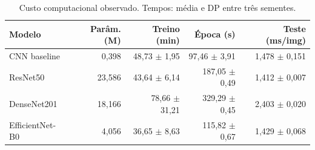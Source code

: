 \begin{table}[htbp]
\centering
\caption{Custo computacional observado. Tempos: média e DP entre três sementes.}
\label{tab:cost}
\small
\begin{tabular}{lrrrr}
\toprule
Modelo & Parâm. (M) & Treino (min) & Época (s) & Teste (ms/img) \\
\midrule
CNN baseline & 0,398 & 48,73 $\pm$ 1,95 & 97,46 $\pm$ 3,91 & 1,478 $\pm$ 0,151 \\
ResNet50 & 23,586 & 43,64 $\pm$ 6,14 & 187,05 $\pm$ 0,49 & 1,412 $\pm$ 0,007 \\
DenseNet201 & 18,166 & 78,66 $\pm$ 31,21 & 329,29 $\pm$ 0,45 & 2,403 $\pm$ 0,020 \\
EfficientNet-B0 & 4,056 & 36,65 $\pm$ 8,63 & 115,82 $\pm$ 0,67 & 1,429 $\pm$ 0,068 \\
\bottomrule
\end{tabular}
\end{table}
